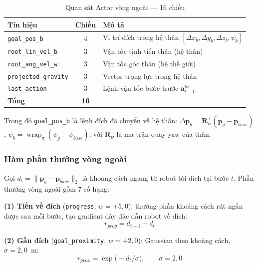 \begin{table}[H]
    \centering
    \caption{Quan sát Actor vòng ngoài — 16 chiều}
    \label{tab:nav_obs}
    \renewcommand{\arraystretch}{1.3}
    \begin{tabular}{|l|c|l|}
    \hline
    \textbf{Tín hiệu} & \textbf{Chiều} & \textbf{Mô tả} \\
    \hline
    \texttt{goal\_pos\_b}        & 4 & Vị trí đích trong hệ thân $[\Delta x_b,\Delta y_b,\Delta z_b,\psi_b]$ \\
    \texttt{root\_lin\_vel\_b}   & 3 & Vận tốc tịnh tiến thân (hệ thân) \\
    \texttt{root\_ang\_vel\_w}   & 3 & Vận tốc góc thân (hệ thế giới) \\
    \texttt{projected\_gravity}  & 3 & Vector trọng lực trong hệ thân \\
    \texttt{last\_action}        & 3 & Lệnh vận tốc bước trước $\mathbf{a}^{hi}_{t-1}$ \\
    \hline
    \textbf{Tổng} & \textbf{16} & \\
    \hline
    \end{tabular}
\end{table}

Trong đó \texttt{goal\_pos\_b} là lệnh đích đã chuyển về hệ thân:
$\Delta\mathbf{p}_b = \mathbf{R}_{\psi}^{\!\top}(\mathbf{p}_g-\mathbf{p}_{base})$,
$\psi_b = \operatorname{wrap}_\pi(\psi_g - \psi_{base})$, với $\mathbf{R}_\psi$
là ma trận quay yaw của thân.

\subsubsection{Hàm phần thưởng vòng ngoài}

Gọi $d_t = \lVert \mathbf{p}_{g} - \mathbf{p}_{base}\rVert_2$ là khoảng cách
ngang từ robot tới đích tại bước $t$. Phần thưởng vòng ngoài gồm 7 số hạng:

\textbf{(1) Tiến về đích} (\texttt{progress}, $w=+5{,}0$): thưởng phần
khoảng cách rút ngắn được sau mỗi bước, tạo gradient dày đặc dẫn robot
về đích:
\begin{equation}
    r_{prog} = d_{t-1} - d_t
    \label{eq:nav_progress}
\end{equation}

\textbf{(2) Gần đích} (\texttt{goal\_proximity}, $w=+2{,}0$): Gaussian theo
khoảng cách, $\sigma=2{,}0$~m:
\begin{equation}
    r_{prox} = \exp\!\bigl(-d_t/\sigma\bigr),\qquad \sigma=2{,}0
    \label{eq:nav_proximity}
\end{equation}

